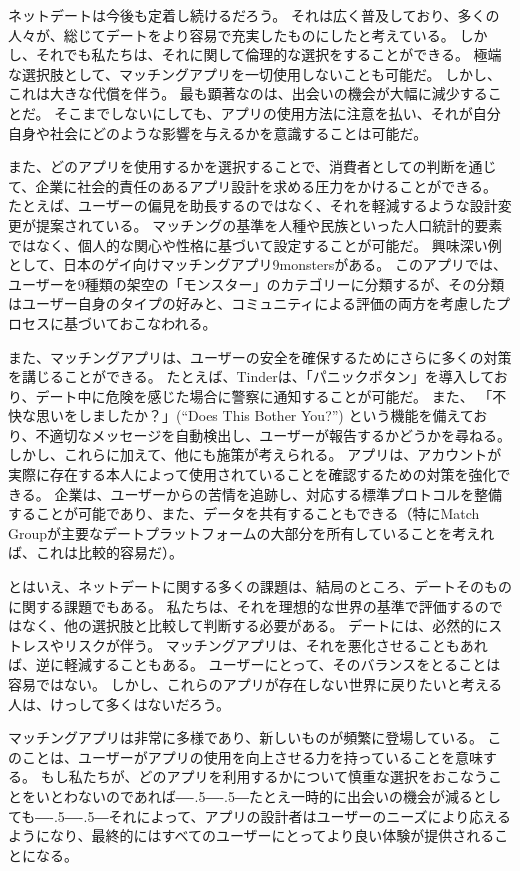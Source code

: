 \documentclass[paper=a4,book,openany]{jlreq}
\def\DDASH{―\kern-.5\zw―\kern-.5\zw―}
\begin{document}
ネットデートは今後も定着し続けるだろう。
それは広く普及しており、多くの人々が、総じてデートをより容易で充実したものにしたと考えている。
しかし、それでも私たちは、それに関して倫理的な選択をすることができる。
極端な選択肢として、マッチングアプリを一切使用しないことも可能だ。
しかし、これは大きな代償を伴う。
最も顕著なのは、出会いの機会が大幅に減少することだ。
そこまでしないにしても、アプリの使用方法に注意を払い、それが自分自身や社会にどのような影響を与えるかを意識することは可能だ。

また、どのアプリを使用するかを選択することで、消費者としての判断を通じて、企業に社会的責任のあるアプリ設計を求める圧力をかけることができる。
たとえば、ユーザーの偏見を助長するのではなく、それを軽減するような設計変更が提案されている。
マッチングの基準を人種や民族といった人口統計的要素ではなく、個人的な関心や性格に基づいて設定することが可能だ。
興味深い例として、日本のゲイ向けマッチングアプリ{9monsters}がある。
このアプリでは、ユーザーを9種類の架空の「モンスター」のカテゴリーに分類するが、その分類はユーザー自身のタイプの好みと、コミュニティによる評価の両方を考慮したプロセスに基づいておこなわれる\citep{miksche17:_meet_gay_app,hutson18:_debias_desir}。

また、マッチングアプリは、ユーザーの安全を確保するためにさらに多くの対策を講じることができる。
たとえば、Tinderは、「パニックボタン」を導入しており、デート中に危険を感じた場合に警察に通知することが可能だ。
また、 「不快な思いをしましたか？」(``Does This Bother You?'') という機能を備えており、不適切なメッセージを自動検出し、ユーザーが報告するかどうかを尋ねる。
しかし、これらに加えて、他にも施策が考えられる。
アプリは、アカウントが実際に存在する本人によって使用されていることを確認するための対策を強化できる。
企業は、ユーザーからの苦情を追跡し、対応する標準プロトコルを整備することが可能であり、また、データを共有することもできる（特にMatch Groupが主要なデートプラットフォームの大部分を所有していることを考えれば、これは比較的容易だ）。

とはいえ、ネットデートに関する多くの課題は、結局のところ、デートそのものに関する課題でもある。
私たちは、それを理想的な世界の基準で評価するのではなく、他の選択肢と比較して判断する必要がある。
デートには、必然的にストレスやリスクが伴う。
マッチングアプリは、それを悪化させることもあれば、逆に軽減することもある。
ユーザーにとって、そのバランスをとることは容易ではない。
しかし、これらのアプリが存在しない世界に戻りたいと考える人は、けっして多くはないだろう。

マッチングアプリは非常に多様であり、新しいものが頻繁に登場している。
このことは、ユーザーがアプリの使用を向上させる力を持っていることを意味する。
もし私たちが、どのアプリを利用するかについて慎重な選択をおこなうことをいとわないのであれば{\DDASH}たとえ一時的に出会いの機会が減るとしても{\DDASH}それによって、アプリの設計者はユーザーのニーズにより応えるようになり、最終的にはすべてのユーザーにとってより良い体験が提供されることになる。
\end{document}
